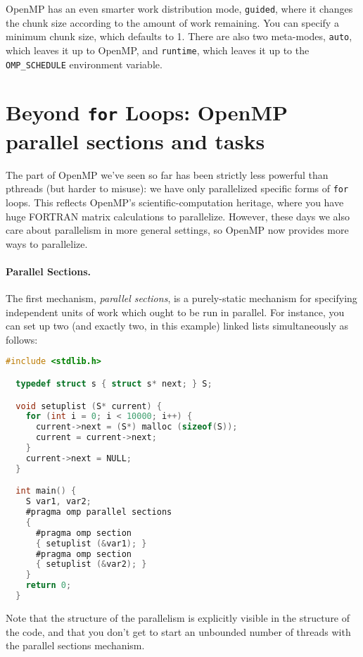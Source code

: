 OpenMP has an even smarter work distribution mode, {\tt guided}, where
it changes the chunk size according to the amount of work remaining.
You can specify a minimum chunk size, which defaults to 1. There
are also two meta-modes, {\tt auto}, which leaves it up to OpenMP, and
{\tt runtime}, which leaves it up to the \verb+OMP_SCHEDULE+ environment
variable.

\section*{Beyond {\tt for} Loops: OpenMP parallel sections and tasks}
The part of OpenMP we've seen so far has been strictly less powerful
than pthreads (but harder to misuse): we have only parallelized
specific forms of {\tt for} loops. This reflects OpenMP's
scientific-computation heritage, where you have huge FORTRAN matrix
calculations to parallelize. However, these days we also care about
parallelism in more general settings, so OpenMP now provides
more ways to parallelize.

\paragraph{Parallel Sections.} The first mechanism, \emph{parallel sections},
is a purely-static mechanism for specifying independent units of work
which ought to be run in parallel. For instance, you can set up two 
(and exactly two, in this example) linked lists simultaneously as follows:

{\small
\begin{lstlisting}[language=C,morekeywords={foreach,pragma,omp,parallel,single,nowait,task,untied,barrier,taskyield}]
  #include <stdlib.h>

  typedef struct s { struct s* next; } S;

  void setuplist (S* current) {
    for (int i = 0; i < 10000; i++) {
      current->next = (S*) malloc (sizeof(S));
      current = current->next;
    }
    current->next = NULL;
  }

  int main() {
    S var1, var2;
    #pragma omp parallel sections
    {
      #pragma omp section
      { setuplist (&var1); }
      #pragma omp section
      { setuplist (&var2); }
    }
    return 0;
  }
\end{lstlisting}
}
Note that the structure of the parallelism is explicitly visible in the
structure of the code, and that you don't get to start an unbounded 
number of threads with the parallel sections mechanism.

